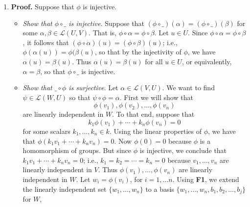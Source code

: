 \documentclass[9pt]{article}
\begin{document}
\begin{enumerate}
      \begin{enumerate}
         \item \textbf{Proof.} Suppose that $\phi$ is injective.
               \begin{itemize}
                  \item \textit{Show that $\phi\circ\_$ is injective}. Suppose
                        that
                        $(\phi\circ\_)(\alpha) = (\phi\circ\_)(\beta)$ for some
                        $\alpha, \beta \in \mathcal{L}(U, V)$. That is,
                        $\phi\circ\alpha = \phi\circ\beta$. Let $u \in U$. Since
                        $\phi\circ\alpha = \phi\circ\beta$, it follows that
                        $(\phi\circ\alpha)(u) = (\phi\circ\beta)(u)$; i.e.,
                        $\phi(\alpha(u)) = \phi(\beta(u)$, so that by the
                        injectivity of $\phi$, we have $\alpha(u) = \beta(u)$.
                        Thus $\alpha(u) = \beta(u)$ for all $u \in U$, or
                        equivalently, $\alpha = \beta$, so that $\phi\circ\_$ is
                        injective.
                  \item \textit{Show that $\_\circ\phi$ is surjective}. Let
                        $\alpha \in \mathcal{L}(V, U)$. We want to find
                        $\psi \in \mathcal{L}(W, U)$ so that
                        $\psi\circ\phi = \alpha$. First we will show that
                        $$\phi(v_1), \phi(v_2), \ldots, \phi(v_n)$$
                        are linearly independent in $W$. To that end, suppose
                        that
                        $$k_1\phi(v_1) + \cdots + k_n\phi(v_n) = 0$$
                        for some scalars $k_1, \ldots, k_n \in k$. Using the
                        linear properties of $\phi$, we have that
                        $\phi(k_1v_1 + \cdots + k_nv_n) = 0$. Now $\phi(0) = 0$
                        because $\phi$ is a homomorphism of groups. But since
                        $\phi$ is injective, we conclude that
                        $k_1v_1 + \cdots + k_nv_n = 0$; i.e.,
                        $k_1 = k_2 = \cdots = k_n = 0$ because
                        $v_1, \ldots, v_n$ are linearly independent in $V$. Thus
                        $\phi(v_1), \ldots, \phi(v_n)$ are linearly independent
                        in $W$. Let $w_i = \phi(v_i)$, for $i = 1, \ldots n$.
                        Using \textbf{F1}, we extend the linearly independent
                        set $\{w_1, \ldots, w_n\}$ to a basis
                        $\{w_1, \ldots, w_n, b_1, b_2, \ldots, b_j\}$ for $W$,

\end{itemize}
\end{enumerate}
\end{enumerate}
\end{document}
